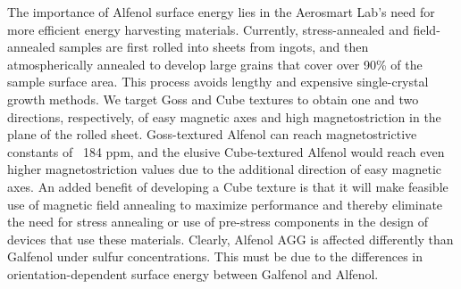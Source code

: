 The importance of Alfenol surface energy lies in the Aerosmart Lab's need for more efficient energy harvesting materials. Currently, stress-annealed and field-annealed samples are first rolled into sheets from ingots, and then atmospherically annealed to develop large grains that cover over 90\% of the sample surface area. This process avoids lengthy and expensive single-crystal growth methods. We target Goss  and Cube  textures to obtain one and two directions, respectively, of easy magnetic axes and high magnetostriction in the plane of the rolled sheet. Goss-textured Alfenol can reach magnetostrictive constants of ~184 ppm, and the elusive Cube-textured Alfenol would reach even higher magnetostriction values due to the additional direction of easy magnetic axes. An added benefit of developing a Cube texture is that it will make feasible use of magnetic field annealing to maximize performance\cite{Yoo2009,Yoo2008} and thereby eliminate the need for stress annealing or use of pre-stress components in the design of devices that use these materials\cite{Restorff2006,Summers2009}. Clearly, Alfenol AGG is affected differently than Galfenol under sulfur concentrations. This must be due to the differences in orientation-dependent surface energy between Galfenol and Alfenol.
	
